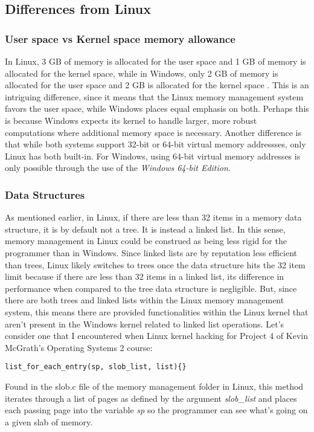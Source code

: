 \documentclass[letterpaper,10pt,titlepage]{article}
\begin{document}
\subsection{Differences from Linux}
\subsubsection{User space vs Kernel space memory allowance}
In Linux, 3 GB of memory is allocated for the user space and 1 GB of memory is allocated for the kernel space, while in Windows, only 2 GB of memory is allocated for the user space and 2 GB is allocated for the kernel space \cite{windows1} \cite{linux1}. This is an intriguing difference, since it means that the Linux memory management system favors the user space, while Windows places equal emphasis on both. Perhaps this is because Windows expects its kernel to handle larger, more robust computations where additional memory space is necessary. Another difference is that while both systems support 32-bit or 64-bit virtual memory addressses, only Linux has both built-in. For Windows, using 64-bit virtual memory addresses is only possible through the use of the \emph{Windows 64-bit Edition}.
\subsubsection{Data Structures}
As mentioned earlier, in Linux, if there are less than 32 items in a memory data structure, it is by default not a tree. It is instead a linked list. In this sense, memory management in Linux could be construed as being less rigid for the programmer than in Windows. Since linked lists are by reputation less efficient than trees, Linux likely switches to trees once the data structure hits the 32 item limit because if there are less than 32 items in a linked list, its difference in performance when compared to the tree data structure is negligible. But, since there are both trees and linked lists within the Linux memory management system, this means there are provided functionalities within the Linux kernel that aren't present in the Windows kernel related to linked list operations. Let's consider one that I encountered when Linux kernel hacking for Project 4 of Kevin McGrath's Operating Systems 2 course: 
\begin{lstlisting}
list_for_each_entry(sp, slob_list, list){}
\end{lstlisting}
Found in the slob.c file of the memory management folder in Linux, this method iterates through a list of pages as defined by the argument \emph{slob\_list} 
and places each passing page into the variable \emph{sp} so the programmer can see what's going on a given slab of memory.
\end{document}
